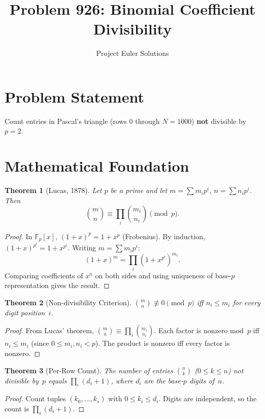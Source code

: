 \documentclass[11pt]{article}
\title{Problem 926: Binomial Coefficient Divisibility}
\author{Project Euler Solutions}
\date{}
\newtheorem{theorem}{Theorem}
\theoremstyle{definition}
\begin{document}
\maketitle

\section{Problem Statement}

Count entries in Pascal's triangle (rows $0$ through $N=1000$) \textbf{not} divisible by $p=2$.

\section{Mathematical Foundation}

\begin{theorem}[Lucas, 1878]
Let $p$ be a prime and let $m = \sum m_i p^i$, $n = \sum n_i p^i$. Then
\[
\binom{m}{n} \equiv \prod_{i} \binom{m_i}{n_i} \pmod{p}.
\]
\end{theorem}

\begin{proof}
In $\mathbb{F}_p[x]$, $(1+x)^p = 1+x^p$ (Frobenius). By induction, $(1+x)^{p^i} = 1+x^{p^i}$. Writing $m = \sum m_i p^i$:
\[
(1+x)^m = \prod_i (1+x^{p^i})^{m_i}.
\]
Comparing coefficients of $x^n$ on both sides and using uniqueness of base-$p$ representation gives the result.
\end{proof}

\begin{theorem}[Non-divisibility Criterion]
$\binom{m}{n} \not\equiv 0 \pmod{p}$ iff $n_i \leq m_i$ for every digit position~$i$.
\end{theorem}

\begin{proof}
From Lucas' theorem, $\binom{m}{n} \equiv \prod_i \binom{m_i}{n_i}$. Each factor is nonzero mod~$p$ iff $n_i \leq m_i$ (since $0 \leq m_i,n_i < p$). The product is nonzero iff every factor is nonzero.
\end{proof}

\begin{theorem}[Per-Row Count]
The number of entries $\binom{n}{k}$ ($0 \leq k \leq n$) not divisible by~$p$ equals $\prod_i (d_i+1)$, where $d_i$ are the base-$p$ digits of~$n$.
\end{theorem}

\begin{proof}
Count tuples $(k_0,\ldots,k_s)$ with $0 \leq k_i \leq d_i$. Digits are independent, so the count is $\prod_i(d_i+1)$.
\end{proof}
\end{document}
